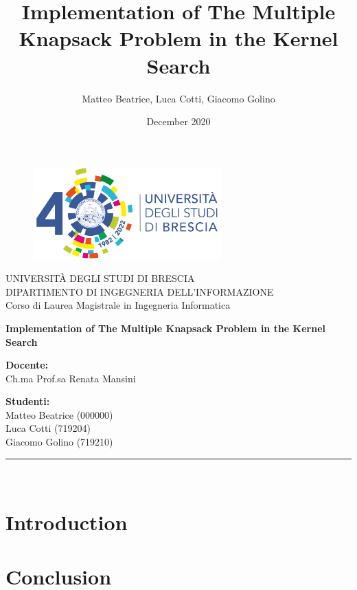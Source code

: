 \documentclass[a4paper,12pt,oneside]{book} %
\title{Implementation of The Multiple Knapsack Problem in the Kernel Search}
\author{Matteo Beatrice, Luca Cotti, Giacomo Golino}
\date{December 2020}
\begin{document}
    \begin{titlepage}
        \begin{figure}[H] %
            \centering
            \includegraphics[width=72.4mm]{logo_unibs}
        \end{figure}

        \begin{center}
            \LARGE{\uppercase{Università degli Studi di Brescia}}\\ %
            \vspace{5mm} %
            \large{\uppercase{Dipartimento di Ingegneria dell'informazione}}\\
            \vspace{5mm}
            \large{Corso di Laurea Magistrale in Ingegneria Informatica}\\
        \end{center}

        \vspace{15mm}

        \begin{center}
            \LARGE{\textbf{Implementation of The Multiple Knapsack Problem in the Kernel Search}}\\
        \end{center}

        \vspace{10mm}

        \begin{flushleft}
            \large
            \textbf{Docente:}\\
            Ch.ma Prof.sa Renata Mansini
        \end{flushleft}

        \begin{flushright}
            \large
            \textbf{Studenti:}\\
            Matteo Beatrice (000000)\\
            Luca Cotti (719204)\\
            Giacomo Golino (719210)
        \end{flushright}

        \vspace*{\fill} %

        \rule{0.8\textwidth}{0.6pt}\\ %
    \end{titlepage}

    \tableofcontents

    \chapter{Introduction}

    \chapter{Conclusion}
    \printbibliography
\end{document}
